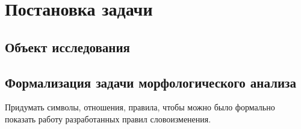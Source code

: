 \chapter{Постановка задачи} \label{chapt_problem_formulation}

\section{Объект исследования} \label{sect_problem_obj}



\section{Формализация задачи морфологического анализа} \label{sect_formal}

Придумать символы, отношения, правила, чтобы можно было формально показать работу 
разработанных правил словоизменения.

